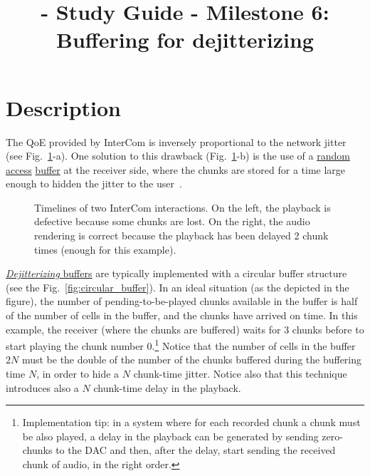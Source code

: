 
\title{\TM{} - Study Guide - Milestone 6: Buffering for dejitterizing}

\maketitle

\section{Description}

The QoE provided by InterCom is inversely proportional to the network
jitter (see Fig.~\ref{fig:timelines}-a). One solution to this drawback
(Fig.~\ref{fig:timelines}-b) is the use of a
\href{https://en.wikipedia.org/wiki/Random_access}{random access}
\href{https://en.wikipedia.org/wiki/Data_buffer}{buffer} at the
receiver side, where the chunks are stored for a time large enough to
hidden the jitter to the user~\cite{Kurose-Ross}.

\begin{figure}
  \begin{center}
  \end{center}
  \caption{Timelines of two InterCom interactions. On the left, the
    playback is defective because some chunks are lost. On the right,
    the audio rendering is correct because the playback has been
    delayed 2 chunk times (enough for this example).}
  \label{fig:timelines}
\end{figure}

\href{https://en.wikipedia.org/wiki/Jitter#Jitter_buffers}{\emph{Dejitterizing}
  buffers} are typically implemented with a circular buffer structure
(see the Fig.~\ref{fig:circular_buffer}). In an ideal situation (as
the depicted in the figure), the number of pending-to-be-played chunks
available in the buffer is half of the number of cells in the buffer,
and the chunks have arrived on time. In this example, the receiver
(where the chunks are buffered) waits for 3 chunks before to start
playing the chunk number 0.\footnote{Implementation tip: in a system
  where for each recorded chunk a chunk must be also played, a delay
  in the playback can be generated by sending zero-chunks to the DAC
  and then, after the delay, start sending the received chunk of
  audio, in the right order.} Notice that the number of cells in the
buffer $2N$ must be the double of the number of the chunks buffered
during the buffering time $N$, in order to hide a $N$ chunk-time
jitter. Notice also that this technique introduces also a $N$
chunk-time delay in the playback.

